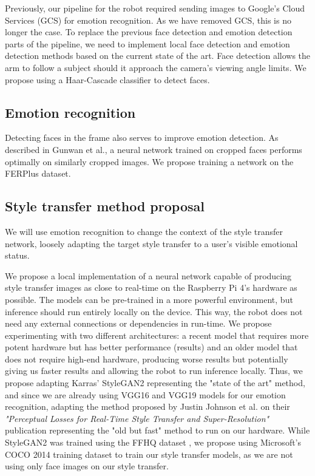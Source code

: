 Previously, our pipeline for the robot required sending images to Google's Cloud Services (GCS) for emotion recognition. As we have removed GCS, this is no longer the case. To replace the previous face detection and emotion detection parts of the pipeline, we need to implement local face detection and emotion detection methods based on the current state of the art. Face detection allows the arm to follow a subject should it approach the camera's viewing angle limits. We propose using a Haar-Cascade classifier to detect faces. 

\subsection{Emotion recognition}
Detecting faces in the frame also serves to improve emotion detection. As described in Gunwan et al.\cite{haarcrop}, a neural network trained on cropped faces performs optimally on similarly cropped images. We propose training a network on the FERPlus\cite{BarsoumICMI2016} dataset.


\subsection{Style transfer method proposal}

We will use emotion recognition to change the context of the style transfer network, loosely adapting the target style transfer to a user's visible emotional status.


We propose a local implementation of a neural network capable of producing style transfer images as close to real-time on the Raspberry Pi 4's hardware as possible. The models can be pre-trained in a more powerful environment, but inference should run entirely locally on the device. This way, the robot does not need any external connections or dependencies in run-time. We propose experimenting with two different architectures: a recent model that requires more potent hardware but has better performance (results) and an older model that does not require high-end hardware, producing worse results but potentially giving us faster results and allowing the robot to run inference locally. Thus, we propose adapting Karras' StyleGAN2 representing the "state of the art" method, and since we are already using VGG16 and VGG19 models for our emotion recognition, adapting the method proposed by Justin Johnson et al. on their \emph{"Perceptual Losses for Real-Time Style Transfer
and Super-Resolution"} \cite{Johnson2016Perceptual} publication representing the "old but fast" method to run on our hardware.
While StyleGAN2 was trained using the FFHQ dataset \cite{nvlabs_2019}, we propose using Microsoft's COCO 2014 training dataset\cite{DBLP:journals/corr/LinMBHPRDZ14} to train our style transfer models, as we are not using only face images on our style transfer. 

